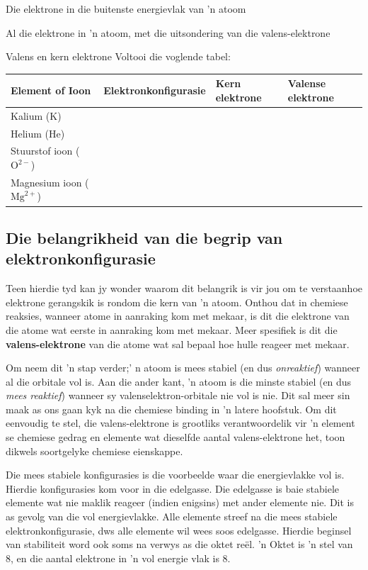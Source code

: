  { Die elektrone in die buitenste energievlak van 'n atoom} 

 {Al die elektrone in 'n atoom, met die uitsondering van die valens-elektrone}
\begin{exercises}{Valens en kern elektrone}
Voltooi die voglende tabel:
 \begin{center}
  \begin{tabular}{|l|l|l|l|} \hline
   \textbf{Element of Ioon} & \textbf{Elektronkonfigurasie} & \textbf{Kern elektrone} & \textbf{Valense elektrone} \\ \hline
   Kalium ($\text{K}$) & & & \\ \hline
   Helium ($\text{He}$) & & & \\ \hline
   Stuurstof ioon ($\text{O}^{2-}$) & & & \\ \hline
   Magnesium ioon ($\text{Mg}^{2+}$) & & & \\ \hline
  \end{tabular}
 \end{center}

\end{exercises}
      
\label{m38741*uid105}
            \subsection*{Die belangrikheid van die begrip van elektronkonfigurasie}
            \nopagebreak
        \label{m38741*id260011}Teen hierdie tyd kan jy wonder waarom dit belangrik is vir jou om te verstaan ​hoe elektrone gerangskik is rondom die kern van 'n atoom. Onthou dat in chemiese reaksies, wanneer atome in aanraking kom met mekaar, is dit die elektrone van die atome wat eerste in aanraking kom met mekaar. Meer spesifiek is dit die \textbf{valens-elektrone} van die atome wat sal bepaal hoe hulle reageer met
mekaar.\par 
        \label{m38741*id260029}
Om neem dit 'n stap verder;' n atoom is mees stabiel (en dus \textsl{onreaktief}) wanneer al die orbitale vol is. Aan die ander kant, 'n atoom is die minste stabiel (en dus \textsl{mees reaktief}) wanneer sy valenselektron-orbitale nie vol is nie. Dit sal meer sin maak as ons gaan kyk na die chemiese binding in 'n latere hoofstuk. Om dit eenvoudig te stel, die valens-elektrone is grootliks verantwoordelik vir 'n element se chemiese gedrag en elemente wat dieselfde aantal valens-elektrone het, toon dikwels soortgelyke chemiese eienskappe.\par 
\label{m38741*eip-106}Die mees stabiele konfigurasies is die voorbeelde waar die energievlakke vol is. Hierdie konfigurasies kom voor in die edelgasse. Die edelgasse is baie stabiele elemente wat nie maklik reageer (indien enigsins) met ander elemente nie. Dit is as gevolg van die vol energievlakke. Alle elemente streef na die mees stabiele elektronkonfigurasie, dws alle elemente wil wees soos edelgasse. Hierdie beginsel van stabiliteit word ook soms na verwys as die oktet reël. 'n Oktet is 'n stel van 8, en die aantal elektrone in 'n vol energie vlak is 8. \par \label{m38741*eip-739}

